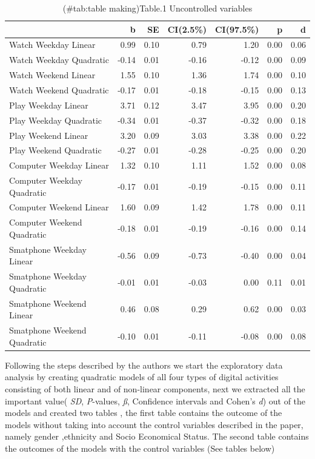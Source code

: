 \documentclass[man]{apa6}
\theoremstyle{definition}
\theoremstyle{definition}
\theoremstyle{definition}
\theoremstyle{remark}
\begin{document}
\begin{table}

\caption{(\#tab:table making)Table.1 Uncontrolled variables}
\centering
\begin{tabular}[t]{l|r|r|r|r|r|r}
\hline
  & b & SE & CI(2.5\%) & CI(97.5\%) & p & d\\
\hline
Watch Weekday Linear & 0.99 & 0.10 & 0.79 & 1.20 & 0.00 & 0.06\\
\hline
Watch Weekday Quadratic & -0.14 & 0.01 & -0.16 & -0.12 & 0.00 & 0.09\\
\hline
Watch Weekend Linear & 1.55 & 0.10 & 1.36 & 1.74 & 0.00 & 0.10\\
\hline
Watch Weekend Quadratic & -0.17 & 0.01 & -0.18 & -0.15 & 0.00 & 0.13\\
\hline
Play Weekday Linear & 3.71 & 0.12 & 3.47 & 3.95 & 0.00 & 0.20\\
\hline
Play Weekday Quadratic & -0.34 & 0.01 & -0.37 & -0.32 & 0.00 & 0.18\\
\hline
Play Weekend Linear & 3.20 & 0.09 & 3.03 & 3.38 & 0.00 & 0.22\\
\hline
Play Weekend Quadratic & -0.27 & 0.01 & -0.28 & -0.25 & 0.00 & 0.20\\
\hline
Computer Weekday Linear & 1.32 & 0.10 & 1.11 & 1.52 & 0.00 & 0.08\\
\hline
Computer Weekday Quadratic & -0.17 & 0.01 & -0.19 & -0.15 & 0.00 & 0.11\\
\hline
Computer Weekend Linear & 1.60 & 0.09 & 1.42 & 1.78 & 0.00 & 0.11\\
\hline
Computer Weekend Quadratic & -0.18 & 0.01 & -0.19 & -0.16 & 0.00 & 0.14\\
\hline
Smatphone Weekday Linear & -0.56 & 0.09 & -0.73 & -0.40 & 0.00 & 0.04\\
\hline
Smatphone Weekday Quadratic & -0.01 & 0.01 & -0.03 & 0.00 & 0.11 & 0.01\\
\hline
Smatphone Weekend Linear & 0.46 & 0.08 & 0.29 & 0.62 & 0.00 & 0.03\\
\hline
Smatphone Weekend Quadratic & -0.10 & 0.01 & -0.11 & -0.08 & 0.00 & 0.08\\
\hline
\end{tabular}
\end{table}

Following the steps described by the authors we start the exploratory
data analysis by creating quadratic models of all four types of digital
activities consisting of both linear and of non-linear components, next
we extracted all the important value( \emph{SD}, \emph{P}-values,
\emph{ß}, Confidence intervals and Cohen's \emph{d}) out of the models
and created two tables , the first table contains the outcome of the
models without taking into account the control variables described in
the paper, namely gender ,ethnicity and Socio Economical Status. The
second table contains the outcomes of the models with the control
variables (See tables below)
\end{document}
